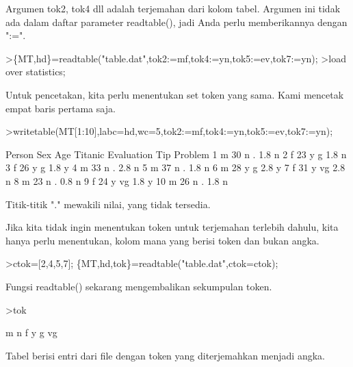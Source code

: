 \documentclass[a4paper,10pt]{article}
\begin{document}
\begin{eulernotebook}
\begin{eulercomment}
Argumen tok2, tok4 dll adalah terjemahan dari kolom tabel. Argumen ini
tidak ada dalam daftar parameter readtable(), jadi Anda perlu
memberikannya dengan ":=".
\end{eulercomment}
\begin{eulerprompt}
>\{MT,hd\}=readtable("table.dat",tok2:=mf,tok4:=yn,tok5:=ev,tok7:=yn);
>load over statistics;
\end{eulerprompt}
\begin{eulercomment}
Untuk pencetakan, kita perlu menentukan set token yang sama. Kami
mencetak empat baris pertama saja.
\end{eulercomment}
\begin{eulerprompt}
>writetable(MT[1:10],labc=hd,wc=5,tok2:=mf,tok4:=yn,tok5:=ev,tok7:=yn);
\end{eulerprompt}
\begin{euleroutput}
   Person  Sex  Age Titanic Evaluation  Tip Problem
        1    m   30       n          .  1.8       n
        2    f   23       y          g  1.8       n
        3    f   26       y          g  1.8       y
        4    m   33       n          .  2.8       n
        5    m   37       n          .  1.8       n
        6    m   28       y          g  2.8       y
        7    f   31       y         vg  2.8       n
        8    m   23       n          .  0.8       n
        9    f   24       y         vg  1.8       y
       10    m   26       n          .  1.8       n
\end{euleroutput}
\begin{eulercomment}
Titik-titik "." mewakili nilai, yang tidak tersedia.

Jika kita tidak ingin menentukan token untuk terjemahan terlebih
dahulu, kita hanya perlu menentukan, kolom mana yang berisi token dan
bukan angka.
\end{eulercomment}
\begin{eulerprompt}
>ctok=[2,4,5,7]; \{MT,hd,tok\}=readtable("table.dat",ctok=ctok);
\end{eulerprompt}
\begin{eulercomment}
Fungsi readtable() sekarang mengembalikan sekumpulan token.
\end{eulercomment}
\begin{eulerprompt}
>tok
\end{eulerprompt}
\begin{euleroutput}
  m
  n
  f
  y
  g
  vg
\end{euleroutput}
\begin{eulercomment}
Tabel berisi entri dari file dengan token yang diterjemahkan menjadi
angka.


\end{eulercomment}
\end{eulernotebook}
\end{document}
